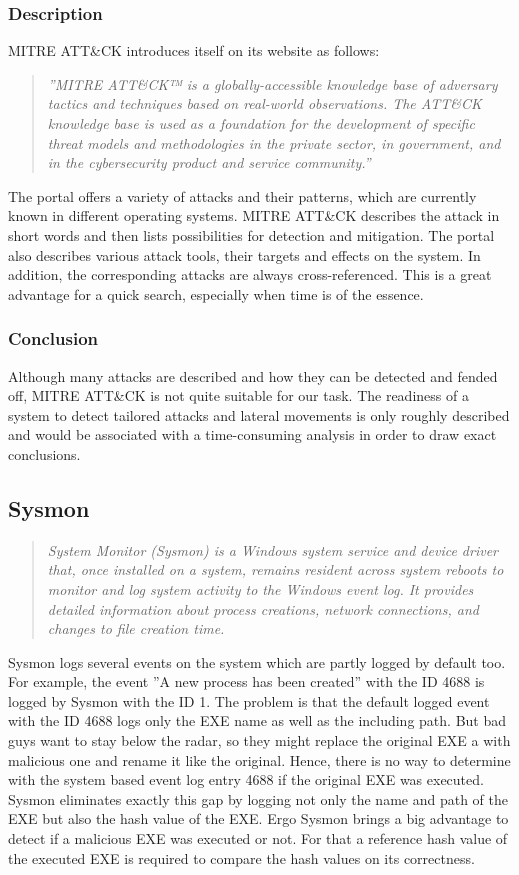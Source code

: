 \subsubsection{Description}
MITRE ATT\&CK introduces itself on its website as follows:
\begin{quotation}
    \textit{''MITRE ATT\&CK™ is a globally-accessible knowledge base of adversary tactics and techniques based on real-world observations. The ATT\&CK knowledge base is used as a foundation for the development of specific threat models and methodologies in the private sector, in government, and in the cybersecurity product and service community.'' \cite{MITRE}} 
\end{quotation}
The portal offers a variety of attacks and their patterns, which are currently known in different operating systems. MITRE ATT\&CK describes the attack in short words and then lists possibilities for detection and mitigation. The portal also describes various attack tools, their targets and effects on the system. In addition, the corresponding attacks are always cross-referenced. This is a great advantage for a quick search, especially when time is of the essence.

\subsubsection{Conclusion}
Although many attacks are described and how they can be detected and fended off, MITRE ATT\&CK is not quite suitable for our task. The readiness of a system to detect tailored attacks and lateral movements is only roughly described and would be associated with a time-consuming analysis in order to draw exact conclusions.

\clearpage

\subsection{Sysmon}
\begin{quotation}
    \textit{System Monitor (Sysmon) is a Windows system service and device driver that, once installed on a system, remains resident across system reboots to monitor and log system activity to the Windows event log. It provides detailed information about process creations, network connections, and changes to file creation time.\cite{Sysmon}}
\end{quotation}
Sysmon logs several events on the system which are partly logged by default too. For example, the event ''A new process has been created'' with the ID 4688 is logged by Sysmon with the ID 1. The problem is that the default logged event with the ID 4688 logs only the EXE name as well as the including path. But bad guys want to stay below the radar, so they might replace the original EXE a with malicious one and rename it like the original. Hence, there is no way to determine with the system based event log entry 4688 if the original EXE was executed. Sysmon eliminates exactly this gap by logging not only the name and path of the EXE but also the hash value of the EXE. Ergo Sysmon brings a big advantage to detect if a malicious EXE was executed or not. For that a reference hash value of the executed EXE is required to compare the hash values on its correctness.

